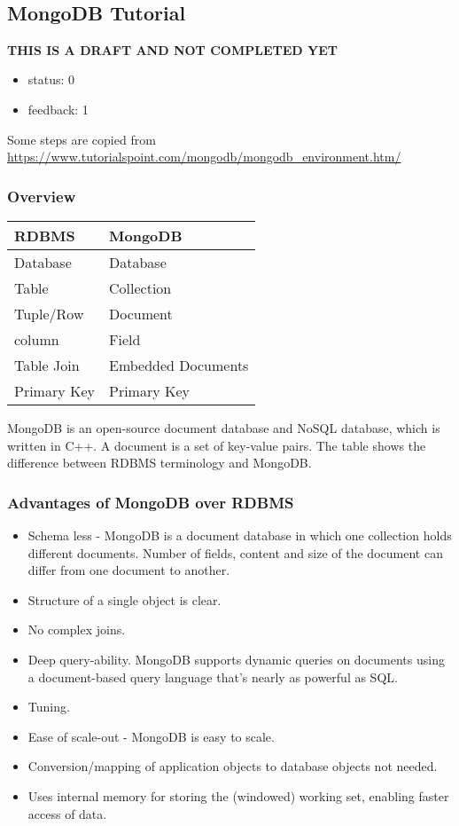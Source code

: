 \MDNAME\

\subsection{MongoDB Tutorial}

\textbf{THIS IS A DRAFT AND NOT COMPLETED YET}

\begin{itemize}
\item
  status: 0
\item
  feedback: 1
\end{itemize}

Some steps are copied from
\url{https://www.tutorialspoint.com/mongodb/mongodb_environment.htm/}

\subsubsection{Overview}

\begin{longtable}[]{@{}ll@{}}
\toprule
RDBMS & MongoDB\tabularnewline
\midrule
\endhead
Database & Database\tabularnewline
Table & Collection\tabularnewline
Tuple/Row & Document\tabularnewline
column & Field\tabularnewline
Table Join & Embedded Documents\tabularnewline
Primary Key & Primary Key\tabularnewline
\bottomrule
\end{longtable}

MongoDB is an open-source document database and NoSQL database, which is
written in C++. A document is a set of key-value pairs. The table shows
the difference between RDBMS terminology and MongoDB.

\subsubsection{Advantages of MongoDB over RDBMS}

\begin{itemize}
\item
  Schema less - MongoDB is a document database in which one collection
  holds different documents. Number of fields, content and size of the
  document can differ from one document to another.
\item
  Structure of a single object is clear.
\item
  No complex joins.
\item
  Deep query-ability. MongoDB supports dynamic queries on documents
  using a document-based query language that's nearly as powerful as
  SQL.
\item
  Tuning.
\item
  Ease of scale-out - MongoDB is easy to scale.
\item
  Conversion/mapping of application objects to database objects not
  needed.
\item
  Uses internal memory for storing the (windowed) working set, enabling
  faster access of data.
\end{itemize}

